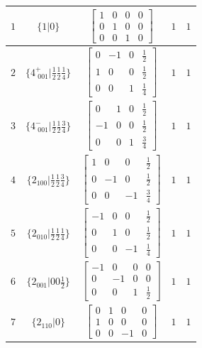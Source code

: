 \documentclass[fleqn,8pt]{jsarticle}
\begin{document}
\begin{longtable}{ccccc}
$ 1 $ & $ \{1|0\} $ & $ \begin{bmatrix} 1 & 0 & 0 & 0 \\ 0 & 1 & 0 & 0 \\ 0 & 0 & 1 & 0 \end{bmatrix} $ & $ 1 $ & $ 1 $ \\ \hline
$ 2 $ & $ \{4^{+}_{\,\,001}|\frac{1}{2} \frac{1}{2} \frac{1}{4}\} $ & $ \begin{bmatrix} 0 & -1 & 0 & \frac{1}{2} \\ 1 & 0 & 0 & \frac{1}{2} \\ 0 & 0 & 1 & \frac{1}{4} \end{bmatrix} $ & $ 1 $ & $ 1 $ \\ \hline
$ 3 $ & $ \{4^{-}_{\,\,001}|\frac{1}{2} \frac{1}{2} \frac{3}{4}\} $ & $ \begin{bmatrix} 0 & 1 & 0 & \frac{1}{2} \\ -1 & 0 & 0 & \frac{1}{2} \\ 0 & 0 & 1 & \frac{3}{4} \end{bmatrix} $ & $ 1 $ & $ 1 $ \\ \hline
$ 4 $ & $ \{2{}_{100}|\frac{1}{2} \frac{1}{2} \frac{3}{4}\} $ & $ \begin{bmatrix} 1 & 0 & 0 & \frac{1}{2} \\ 0 & -1 & 0 & \frac{1}{2} \\ 0 & 0 & -1 & \frac{3}{4} \end{bmatrix} $ & $ 1 $ & $ 1 $ \\ \hline
$ 5 $ & $ \{2{}_{010}|\frac{1}{2} \frac{1}{2} \frac{1}{4}\} $ & $ \begin{bmatrix} -1 & 0 & 0 & \frac{1}{2} \\ 0 & 1 & 0 & \frac{1}{2} \\ 0 & 0 & -1 & \frac{1}{4} \end{bmatrix} $ & $ 1 $ & $ 1 $ \\ \hline
$ 6 $ & $ \{2{}_{001}|0 0 \frac{1}{2}\} $ & $ \begin{bmatrix} -1 & 0 & 0 & 0 \\ 0 & -1 & 0 & 0 \\ 0 & 0 & 1 & \frac{1}{2} \end{bmatrix} $ & $ 1 $ & $ 1 $ \\ \hline
$ 7 $ & $ \{2{}_{110}|0\} $ & $ \begin{bmatrix} 0 & 1 & 0 & 0 \\ 1 & 0 & 0 & 0 \\ 0 & 0 & -1 & 0 \end{bmatrix} $ & $ 1 $ & $ 1 $ \\ \hline

\end{longtable}
\end{document}
